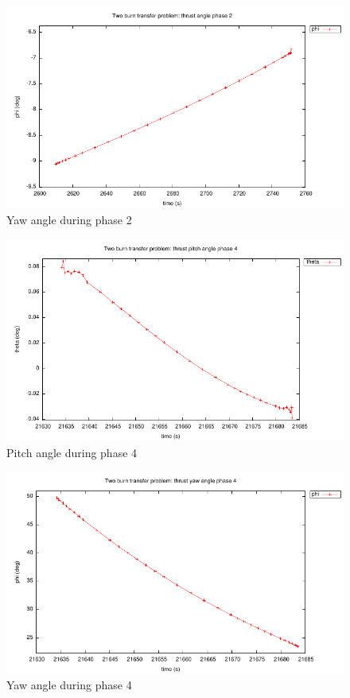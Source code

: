 \documentclass[a4paper,11pt]{report}    %
\begin{document}
\begin{figure}
  \centering 
  \includegraphics{../examples/twoburn/phi2}
  \caption{Yaw angle during phase 2}
 \label{fig:twoburn_phi2}
\end{figure}

\begin{figure}
  \centering 
  \includegraphics{../examples/twoburn/theta4}
  \caption{Pitch angle during phase 4}
 \label{fig:twoburn_theta4}
\end{figure}


\begin{figure}
  \centering 
  \includegraphics{../examples/twoburn/phi4}
  \caption{Yaw angle during phase 4}
 \label{fig:twoburn_phi4}
\end{figure}
\end{document}
